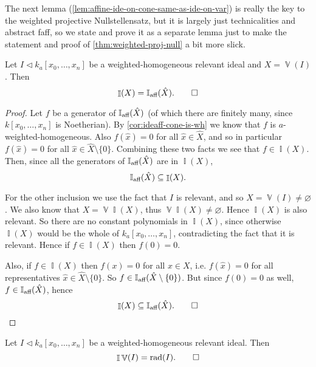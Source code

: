 \documentclass[10pt,notitlepage]{article}
\numberwithin{equation}{subsection}
\DeclareMathOperator{\van}{\mathbb{V}}
\DeclareMathOperator{\ide}{\mathbb{I}}
\DeclareMathOperator{\rad}{rad}
\DeclareMathOperator{\ideaff}{\mathbb{I}_{\textnormal{aff}}}
\newcommand{\noz}{\setminus\{0\}}
\newcommand{\kazn}{k_a[x_0,\ldots,x_n]}
\begin{document}
    The next lemma (\cref{lem:affine-ide-on-cone-same-as-ide-on-var}) is really the key to the weighted projective Nullstellensatz, but it is largely just technicalities and abstract faff, so we state and prove it as a separate lemma just to make the statement and proof of \cref{thm:weighted-proj-null} a bit more slick.

    \begin{lemma}\label{lem:affine-ide-on-cone-same-as-ide-on-var}
        Let $I\triangleleft \kazn$ be a weighted-homogeneous relevant ideal and $X=\van(I)$.
        Then
        \[
            \ide(X) = \ideaff(\hat{X}).\qedhere
        \]
    \end{lemma}

    \begin{proof}
        Let $f$ be a generator of $\ideaff(\hat{X})$ (of which there are finitely many, since $k[x_0,\ldots,x_n]$ is Noetherian).
        By \cref{cor:ideaff-cone-is-wh} we know that $f$ is $a$-weighted-homogeneous.
        Also $f(\hat{x})=0$ for all $\hat{x}\in\hat{X}$, and so in particular $f(\hat{x})=0$ for all $\hat{x}\in\hat{X}\noz$.
        Combining these two facts we see that $f\in\ide(X)$.
        Then, since all the generators of $\ideaff(\hat{X})$ are in $\ide(X)$,
        \[
            \ideaff(\hat{X})\subseteq\ide(X).
        \]
        
        For the other inclusion we use the fact that $I$ is relevant, and so $X=\van(I)\neq\varnothing$.
        We also know that $X=\van\ide(X)$, thus $\van\ide(X)\neq\varnothing$.
        Hence $\ide(X)$ is also relevant.
        So there are no constant polynomials in $\ide(X)$, since otherwise $\ide(X)$ would be the whole of $\kazn$, contradicting the fact that it is relevant.
        Hence if $f\in\ide(X)$ then $f(0)=0$.

        Also, if $f\in\ide(X)$ then $f(x)=0$ for all $x\in X$, i.e. $f(\hat{x})=0$ for all representatives $\hat{x}\in\hat{X}\noz$.
        So $f\in\ideaff(\hat{X}\noz)$.
        But since $f(0)=0$ as well, $f\in\ideaff(\hat{X})$, hence
        \[
            \ide(X)\subseteq\ideaff(\hat{X}).\qedhere
        \]
    \end{proof}

    \begin{theorem}\label{thm:weighted-proj-null}
        Let $I\triangleleft \kazn$ be a weighted-homogeneous relevant ideal.
        Then
        \[
            \ide\van(I)=\rad(I).\qedhere
        \]
    \end{theorem}
\end{document}
